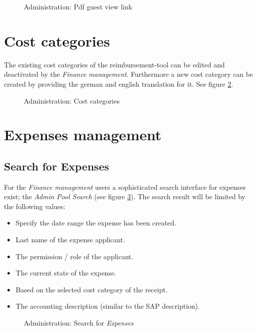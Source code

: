 \begin{figure}[H]
    \centering
    \caption{Administration: Pdf guest view link}
    \label{fig:pdf-web}
\end{figure}

\section{Cost categories}

The existing cost categories of the reimbursement-tool can be edited and deactivated by the \textit{Finance management}. Furthermore a new cost category can be created by providing the german and english translation for it. See figure \ref{fig:admin-costcategories}.

\begin{figure}[H]
    \centering
    \caption{Administration: Cost categories}
    \label{fig:admin-costcategories}
\end{figure}

\section{Expenses management}
\subsection{Search for Expenses}

For the \textit{Finance management} users a sophisticated search interface for expenses exist; the \textit{Admin Pool Search} (see figure \ref{fig:admin-search}). The search result will be limited by the following values:

\begin{itemize}
    \item Specify the date range the expense has been created.
    \item Last name of the expense applicant.
    \item The permission / role of the applicant.
    \item The current state of the expense.
    \item Based on the selected cost category of the receipt.
    \item The accounting description (similar to the SAP description).
\end{itemize}

\begin{figure}[H]
    \centering
    \caption{Administration: Search for \textit{Expenses}}
    \label{fig:admin-search}
\end{figure}

